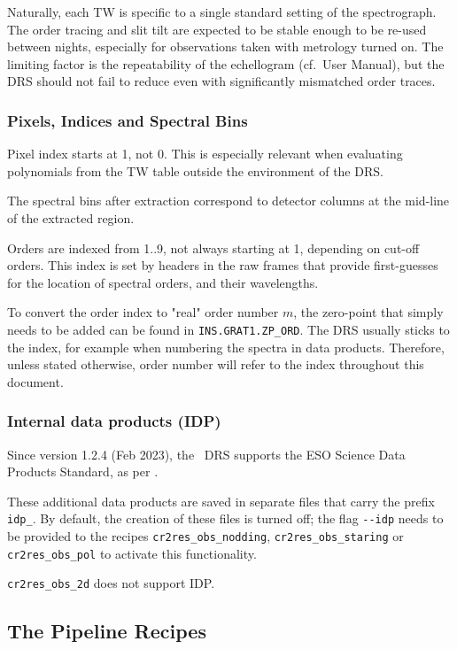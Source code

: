 Naturally, each TW is specific to a single standard setting of the spectrograph.
The order tracing and slit tilt are expected to be stable enough to be re-used
between nights, especially for observations taken with metrology turned on. The
limiting factor is the repeatability of the echellogram (cf.~User Manual), but
the DRS should not fail to reduce even with significantly mismatched order
traces.

\subsubsection{Pixels, Indices and Spectral Bins}
Pixel index starts at 1, not 0. This is especially relevant when evaluating
polynomials from the TW table outside the environment of the DRS.

The spectral bins after extraction correspond to detector columns at the
mid-line of the extracted region.

Orders are indexed from 1..9, not always starting at 1, depending on cut-off
orders. This index is set by headers in the raw frames that provide first-guesses
for the location of spectral orders, and their wavelengths.

To convert the order index to "real" order number $m$, the zero-point that
simply needs to be added can be found in \texttt{INS.GRAT1.ZP\_ORD}. The DRS
usually sticks to the index, for example when numbering the spectra in data
products. Therefore, unless stated otherwise, order number will refer to the
index throughout this document.

\subsubsection{Internal data products (IDP)}
\label{sec:idp}
Since version 1.2.4 (Feb 2023), the \instrument\ DRS supports the ESO Science
Data Products Standard, as per \cite{SDPSTD}.

These additional data products are saved in separate files that carry the prefix
\verb!idp_!. By default, the creation of these files is turned off; the flag
\verb!--idp! needs to be provided to the recipes \verb!cr2res_obs_nodding!,
\verb!cr2res_obs_staring! or \verb!cr2res_obs_pol! to activate this
functionality.

\verb!cr2res_obs_2d! does not support IDP.

\subsection{The Pipeline Recipes}
\label{sec:recipes-quick}

